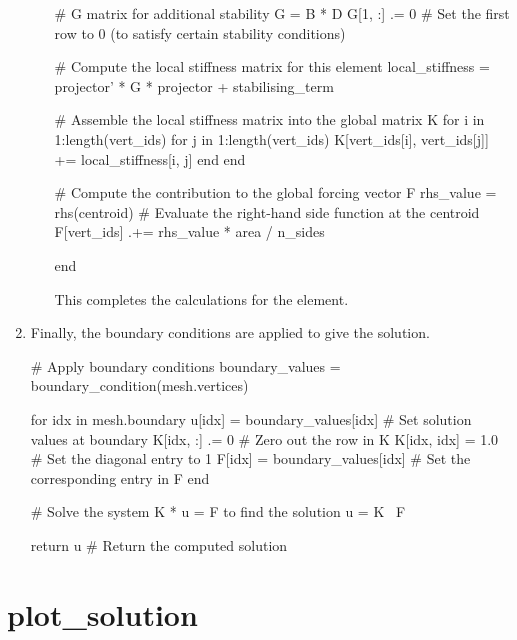 \documentclass{report}
\begin{document}
\begin{enumerate}
\begin{enumerate}
\begin{jllisting}[style=JuliaStyle]
                # G matrix for additional stability
                G = B * D
                G[1, :] .= 0  # Set the first row to 0 (to satisfy certain stability conditions)
        
                # Compute the local stiffness matrix for this element
                local_stiffness = projector' * G * projector + stabilising_term
        
                # Assemble the local stiffness matrix into the global matrix K
                for i in 1:length(vert_ids)
                    for j in 1:length(vert_ids)
                        K[vert_ids[i], vert_ids[j]] += local_stiffness[i, j]
                    end
                end
        
                # Compute the contribution to the global forcing vector F
                rhs_value = rhs(centroid)  # Evaluate the right-hand side function at the centroid
                F[vert_ids] .+= rhs_value * area / n_sides
        
            end
        \end{jllisting}

        This completes the calculations for the element.

    \end{enumerate}
    
    \item Finally, the boundary conditions are applied to give the solution.
    \begin{jllisting}[style=JuliaStyle]
    # Apply boundary conditions
    boundary_values = boundary_condition(mesh.vertices)
    
    for idx in mesh.boundary
        u[idx] = boundary_values[idx]  # Set solution values at boundary
        K[idx, :] .= 0  # Zero out the row in K
        K[idx, idx] = 1.0  # Set the diagonal entry to 1
        F[idx] = boundary_values[idx]  # Set the corresponding entry in F
    end
    
    # Solve the system K * u = F to find the solution
    u = K \ F
    
    return u  # Return the computed solution
    \end{jllisting}
\end{enumerate}



\section{plot\_solution}
\end{document}
